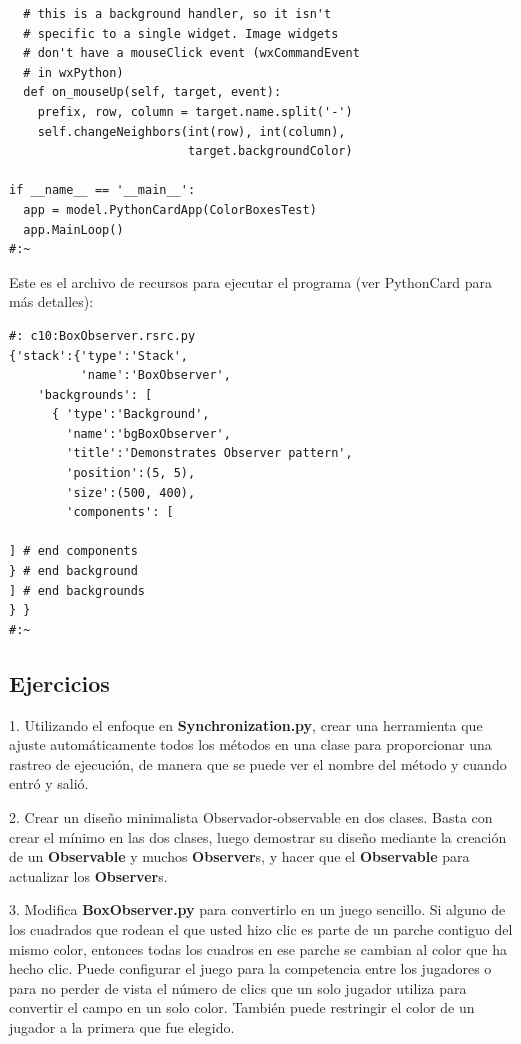 \documentclass{article}
\begin{document}
\begin{lstlisting}
  # this is a background handler, so it isn't   
  # specific to a single widget. Image widgets  
  # don't have a mouseClick event (wxCommandEvent 
  # in wxPython) 
  def on_mouseUp(self, target, event): 
    prefix, row, column = target.name.split('-') 
    self.changeNeighbors(int(row), int(column),  
                         target.backgroundColor) 
                         
if __name__ == '__main__': 
  app = model.PythonCardApp(ColorBoxesTest) 
  app.MainLoop() 
#:~ 
\end{lstlisting}

Este es el archivo de recursos para ejecutar el programa (ver PythonCard para más detalles):  \newline

\begin{lstlisting} 
#: c10:BoxObserver.rsrc.py 
{'stack':{'type':'Stack', 
          'name':'BoxObserver', 
    'backgrounds': [ 
      { 'type':'Background', 
        'name':'bgBoxObserver', 
        'title':'Demonstrates Observer pattern', 
        'position':(5, 5), 
        'size':(500, 400), 
        'components': [ 
        
] # end components 
} # end background 
] # end backgrounds 
} } 
#:~ 
\end{lstlisting}

\subsection{Ejercicios}

1. Utilizando el enfoque en  \textbf{Synchronization.py}, crear una herramienta que ajuste automáticamente todos los métodos en una clase para proporcionar una rastreo de ejecución, de manera que se puede ver el nombre del método y cuando entró y salió. \newline

2. Crear un diseño minimalista Observador-observable en dos clases. Basta con crear el mínimo en las dos clases, luego demostrar su diseño mediante la creación de un \textbf{Observable} y muchos \textbf{Observer}s, y hacer que el \textbf{Observable} para actualizar los \textbf{Observer}s.   \newline

3. Modifica \textbf{BoxObserver.py} para convertirlo en un juego sencillo. Si alguno de los cuadrados que rodean el que usted hizo clic es parte de un parche contiguo del mismo color, entonces todas los cuadros en ese parche se cambian al color que ha hecho clic. Puede configurar el juego para la competencia entre los jugadores o para no perder de vista el número de clics que un solo jugador utiliza para convertir el campo en un solo color. También puede restringir el color de un jugador a la primera que fue elegido. \newline
\end{document}
